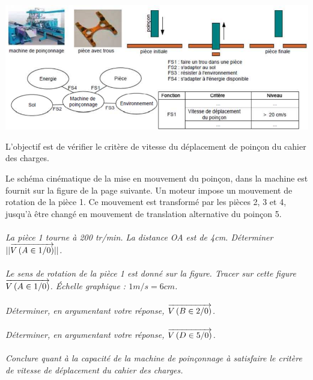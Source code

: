 \documentclass[11pt,oneside]{article}
\begin{document}
\begin{center}
\includegraphics[width=.9\textwidth]{png/fig1}
\end{center}

L'objectif est de vérifier le critère de vitesse du déplacement de poinçon du cahier des charges.

Le schéma cinématique de la mise en mouvement du poinçon, dans la machine est fournit sur la figure de la page suivante. Un moteur impose un mouvement de rotation de la pièce 1. Ce mouvement est transformé par les pièces 2, 3 et 4, jusqu'à être changé en mouvement de translation alternative du poinçon 5. 

\paragraph{}
\textit{La pièce 1 tourne à 200 tr/min. La distance OA est de 4cm. Déterminer $||\overrightarrow{V\left( {A} \in {1}/{0}\right)}||$.}

\paragraph{}
\textit{Le sens de rotation de la pièce 1 est donné sur la figure. Tracer sur cette figure $\overrightarrow{V\left( {A} \in {1}/{0}\right)}$. Échelle graphique : $1m/s = 6cm$.}

\paragraph{}
\textit{Déterminer, en argumentant votre réponse, $\overrightarrow{V\left( {B} \in {2}/{0}\right)}$.}

\paragraph{}
\textit{Déterminer, en argumentant votre réponse, $\overrightarrow{V\left( {D} \in {5}/{0}\right)}$.}

\paragraph{}
\textit{Conclure quant à la capacité de la machine de poinçonnage à satisfaire le critère de vitesse de déplacement du cahier des charges.}
\end{document}
